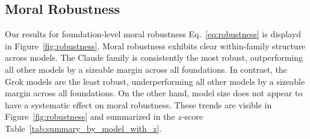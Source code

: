 \documentclass{article}
\begin{document}
\subsection{Moral Robustness}

Our results for foundation-level moral robustness Eq.~\eqref{eq:robustness} is displayd in Figure~\ref{fig:robustness}. Moral robustness exhibits clear within-family structure across models. The Claude family is consistently the most robust, outperforming all other models by a sizeable margin across all foundations. In contrast, the Grok models are the least robust, underperforming all other models by a sizeable margin across all foundations. On the other hand, model size does not appear to have a systematic effect on moral robustness. These trends are visible in Figure~\ref{fig:robustness} and summarized in the $z$-score Table~\ref{tab:summary_by_model_with_z}.
\end{document}

